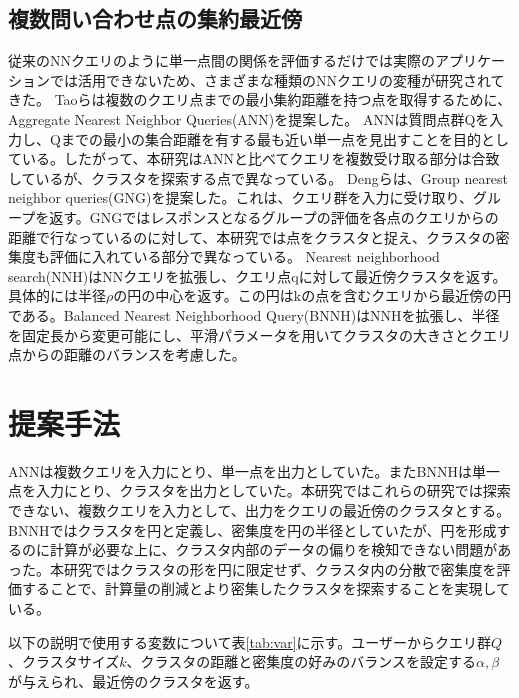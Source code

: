 \documentclass{deimj}
\begin{document}
\subsection{複数問い合わせ点の集約最近傍}
従来のNNクエリのように単一点間の関係を評価するだけでは実際のアプリケーションでは活用できないため、さまざまな種類のNNクエリの変種が研究されてきた。 Taoらは複数のクエリ点までの最小集約距離を持つ点を取得するために、Aggregate Nearest Neighbor Queries(ANN)\cite{ANN}を提案した。 ANNは質問点群Qを入力し、Qまでの最小の集合距離を有する最も近い単一点を見出すことを目的としている。したがって、本研究はANNと比べてクエリを複数受け取る部分は合致しているが、クラスタを探索する点で異なっている。 Dengらは、Group nearest neighbor queries(GNG)\cite{GNG}を提案した。これは、クエリ群を入力に受け取り、グループを返す。GNGではレスポンスとなるグループの評価を各点のクエリからの距離で行なっているのに対して、本研究では点をクラスタと捉え、クラスタの密集度も評価に入れている部分で異なっている。
Nearest neighborhood search(NNH)\cite{NNH}はNNクエリを拡張し、クエリ点qに対して最近傍クラスタを返す。具体的には半径$\rho$の円の中心を返す。この円はkの点を含むクエリから最近傍の円である。Balanced Nearest Neighborhood Query(BNNH)\cite{BNNH}はNNHを拡張し、半径を固定長から変更可能にし、平滑パラメータを用いてクラスタの大きさとクエリ点からの距離のバランスを考慮した。


\section{提案手法}

ANN\cite{ANN}は複数クエリを入力にとり、単一点を出力としていた。またBNNH\cite{BNNH}は単一点を入力にとり、クラスタを出力としていた。本研究ではこれらの研究では探索できない、複数クエリを入力として、出力をクエリの最近傍のクラスタとする。
BNNH\cite{BNNH}ではクラスタを円と定義し、密集度を円の半径としていたが、円を形成するのに計算が必要な上に、クラスタ内部のデータの偏りを検知できない問題があった。本研究ではクラスタの形を円に限定せず、クラスタ内の分散で密集度を評価することで、計算量の削減とより密集したクラスタを探索することを実現している。

以下の説明で使用する変数について表\ref{tab:var}に示す。ユーザーからクエリ群$Q$、クラスタサイズ$k$、クラスタの距離と密集度の好みのバランスを設定する$\alpha, \beta$が与えられ、最近傍のクラスタを返す。
\end{document}
